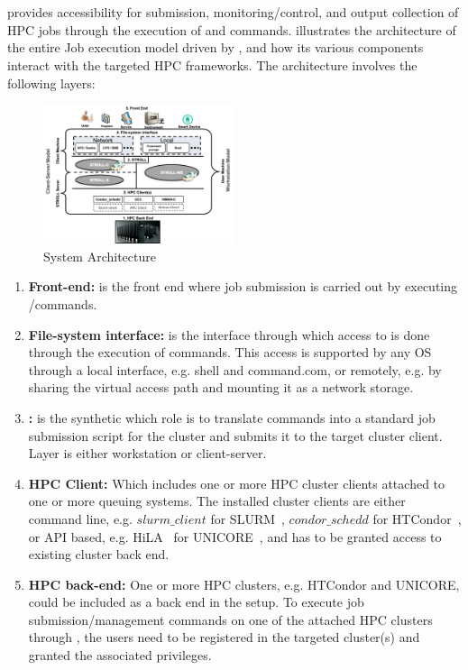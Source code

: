 \section{\name \Fs} 
\label{sec:stroll-arch}

 \name provides accessibility for submission, monitoring/control, and output collection of HPC jobs through the execution of \rc and \wc \fs commands.  illustrates the architecture of the entire Job execution model driven by \name, and how its various components interact with the targeted HPC frameworks. The architecture involves the following layers:


\begin{figure}[htbp]
  \centering
  \includegraphics[width=0.5\textwidth]{figures/stroll-arch}                
  \caption{System Architecture}
  \label{fig:system-arch}
\end{figure}

\begin{enumerate}
	\item \textbf{Front-end:} is the front end where job submission is carried out by executing \rc/\wc \fs commands. 
	\item \textbf{File-system interface:} is the interface through which access to \name is done through the execution of \fs commands. This access is supported by any OS through a local \fs interface, e.g. shell and command.com, or remotely, e.g. by sharing the virtual access path and mounting it as a network storage.
	\item \textbf{\name \fs:} is the synthetic \fs which role is to translate \fs commands into a standard job submission script for the cluster and submits it to the target cluster client. \name \fs Layer is either workstation or client-server.
	\item \textbf{HPC Client:} Which includes one or more HPC cluster clients attached to one or more queuing systems. The installed cluster clients are either command line, e.g. $slurm\_client$ for SLURM~\cite{slurm}, $condor\_schedd$ for HTCondor~\cite{condor-paper}, or API based, e.g. HiLA~\cite{hila} for UNICORE~\cite{unicore-paper}, and has to be granted access to existing cluster back end.
	\item \textbf{HPC back-end:} One or more HPC clusters, e.g. HTCondor and UNICORE, could be included as a back end in the setup. To execute job submission/management commands on one of the attached HPC clusters through \name, the users need to be registered in the targeted cluster(s) and granted the associated privileges.
\end{enumerate}


